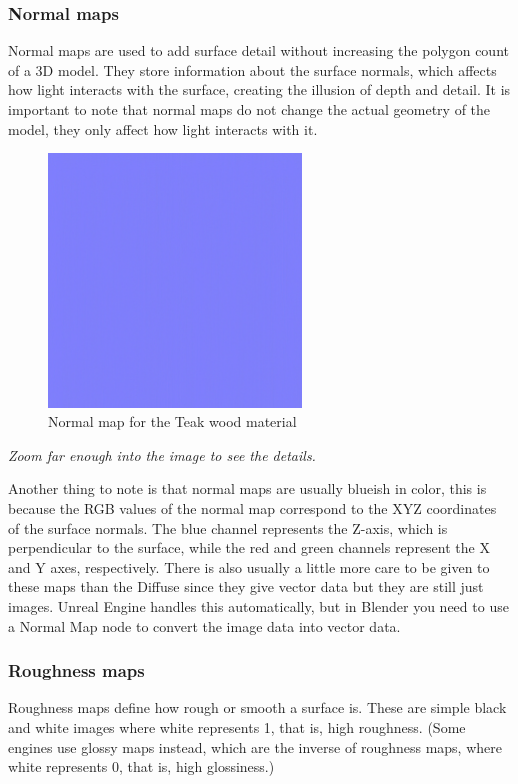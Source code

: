 \documentclass{article}
\begin{document}
\subsubsection{Normal maps}
Normal maps are used to add surface detail without increasing the polygon count of a 3D model. They store information about the surface normals, which affects how light interacts with the surface, creating the illusion of depth and detail. It is important to note that normal maps do not change the actual geometry of the model, they only affect how light interacts with it.
\begin{figure}[h]
    \centering
    \includegraphics[width=0.6\textwidth]{week1/Teak_4k_Normal.jpg}
    \caption{Normal map for the Teak wood material}
    \label{fig:normal_map}
\end{figure}
\textit{Zoom far enough into the image to see the details.}

Another thing to note is that normal maps are usually blueish in color, this is because the RGB values of the normal map correspond to the XYZ coordinates of the surface normals. The blue channel represents the Z-axis, which is perpendicular to the surface, while the red and green channels represent the X and Y axes, respectively. There is also usually a little more care to be given to these maps than the Diffuse since they give vector data but they are still just images. Unreal Engine handles this automatically, but in Blender you need to use a Normal Map node to convert the image data into vector data.

\subsubsection{Roughness maps}
Roughness maps define how rough or smooth a surface is. These are simple black and white images where white represents 1, that is, high roughness. (Some engines use glossy maps instead, which are the inverse of roughness maps, where white represents 0, that is, high glossiness.)
\end{document}
